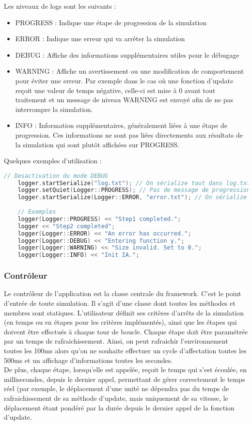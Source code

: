 Les niveaux de logs sont les suivants :
\begin{itemize}
\item PROGRESS : Indique une étape de progression de la simulation
\item ERROR : Indique une erreur qui va arrêter la simulation
\item DEBUG : Affiche des informations supplémentaires utiles pour le débugage
\item WARNING : Affiche un avertissement ou une modification de comportement pour éviter une erreur. Par exemple dans le cas où une fonction d'update reçoit une valeur de temps négative, celle-ci est mise à 0 avant tout traitement et un message de niveau WARNING est envoyé afin de ne pas interrompre la simulation.
\item INFO : Information supplémentaires, généralement liées à une étape de progression. Ces informations ne sont pas liées directements aux résultats de la simulation qui sont plutôt affichées sur PROGRESS.
\end{itemize}

Quelques exemples d'utilisation :
\begin{lstlisting}[label=nvi_code,caption=Utilisation du logger,language=C++]
    // Desactivation du mode DEBUG
    logger.startSerialize("log.txt"); // On sérialize tout dans log.txt
    logger.setQuiet(Logger::PROGRESS); // Pas de message de progression affiché
    logger.startSerialize(Logger::ERROR, "error.txt"); // On sérialize les erreurs à part
        
    // Exemples
    logger(Logger::PROGRESS) << "Step1 completed.";
    logger << "Step2 completed";
    logger(Logger::ERROR) << "An error has occurred.";
    logger(Logger::DEBUG) << "Entering function y.";
    logger(Logger::WARNING) << "Size invalid. Set to 0.";
    logger(Logger::INFO) << "Init IA.";
\end{lstlisting}

\subsubsection{Contrôleur}
Le contrôleur de l'application est la classe centrale du framework. C'est le point d'entrée de toute simulation.
Il s'agit d'une classe dont toutes les méthodes et membres sont statiques. L'utilisateur définit ses critères d'arrêts de la simulation (en temps ou en étapes pour les critères implémentés), ainsi que les étapes qui doivent être effectués à chaque tour de boucle. Chaque étape doit être paramétrée par un temps de rafraichissement. Ainsi, on peut rafraichir l'environnement toutes les 100ms alors qu'on ne souhaite effectuer un cycle d'affectation toutes les 500ms et un affichage d'informations toutes les secondes.\\
De plus, chaque étape, lorsqu'elle est appelée, reçoit le temps qui s'est écoulée, en millisecondes, depuis le dernier appel, permettant de gérer correctement le temps réel (par exemple, le déplacement d'une unité ne dépendra pas du temps de rafraichissement de sa méthode d'update, mais uniquement de sa vitesse, le déplacement étant pondéré par la durée depuis le dernier appel de la fonction d'update.\\\\

